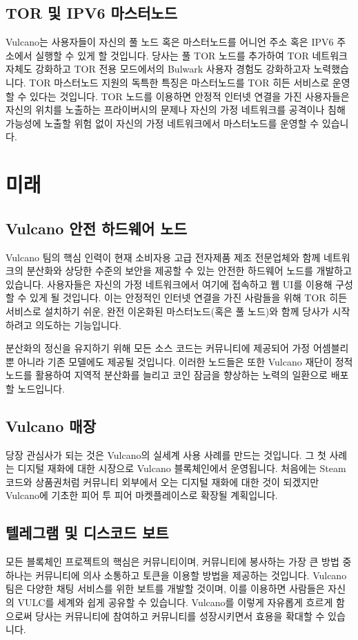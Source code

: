 \documentclass[A4paper, 12pt]{article}
\begin{document}
\subsection{TOR 및 IPV6 마스터노드}
Vulcano는 사용자들이 자신의 풀 노드 혹은 마스터노드를 어니언 주소 혹은 IPV6 주소에서 실행할 수 있게 할 것입니다. 당사는 풀 TOR 노드를 추가하여 TOR 네트워크 자체도 강화하고 TOR 전용 모드에서의 Bulwark 사용자 경험도 강화하고자 노력했습니다. TOR 마스터노드 지원의 독특한 특징은 마스터노드를 TOR 히든 서비스로 운영할 수 있다는 것입니다. TOR 노드를 이용하면 안정적 인터넷 연결을 가진 사용자들은 자신의 위치를 노출하는 프라이버시의 문제나 자신의 가정 네트워크를 공격이나 침해 가능성에 노출할 위험 없이 자신의 가정 네트워크에서 마스터노드를 운영할 수 있습니다.
 
\section{미래}
\subsection{Vulcano 안전 하드웨어 노드}
Vulcano 팀의 핵심 인력이 현재 소비자용 고급 전자제품 제조 전문업체와 함께 네트워크의 분산화와 상당한 수준의 보안을 제공할 수 있는 안전한 하드웨어 노드를 개발하고 있습니다. 사용자들은 자신의 가정 네트워크에서 여기에 접속하고 웹 UI를 이용해 구성할 수 있게 될 것입니다. 이는 안정적인 인터넷 연결을 가진 사람들을 위해 TOR 히든 서비스로 설치하기 쉬운, 완전 이온화된 마스터노드(혹은 풀 노드)와 함께 당사가 시작하려고 의도하는 기능입니다.

분산화의 정신을 유지하기 위해 모든 소스 코드는 커뮤니티에 제공되어 가정 어셈블리 뿐 아니라 기존 모델에도 제공될 것입니다. 이러한 노드들은 또한 Vulcano 재단이 정적 노드를 활용하여 지역적 분산화를 늘리고 코인 잠금을 향상하는 노력의 일환으로 배포할 노드입니다.

\subsection{Vulcano 매장}
당장 관심사가 되는 것은 Vulcano의 실세계 사용 사례를 만드는 것입니다. 그 첫 사례는 디지털 재화에 대한 시장으로 Vulcano 블록체인에서 운영됩니다. 처음에는 Steam 코드와 상품권처럼 커뮤니티 외부에서 오는 디지털 재화에 대한 것이 되겠지만 Vulcano에 기초한 피어 투 피어 마켓플레이스로 확장될 계획입니다.

\subsection{텔레그램 및 디스코드 보트}
모든 블록체인 프로젝트의 핵심은 커뮤니티이며, 커뮤니티에 봉사하는 가장 큰 방법 중 하나는 커뮤니티에 의사 소통하고 토큰을 이용할 방법을 제공하는 것입니다. Vulcano 팀은 다양한 채팅 서비스를 위한 보트를 개발할 것이며, 이를 이용하면 사람들은 자신의 VULC를 세계와 쉽게 공유할 수 있습니다. Vulcano를 이렇게 자유롭게 흐르게 함으로써 당사는 커뮤니티에 참여하고 커뮤니티를 성장시키면서 효용을 확대할 수 있습니다.
\end{document}
